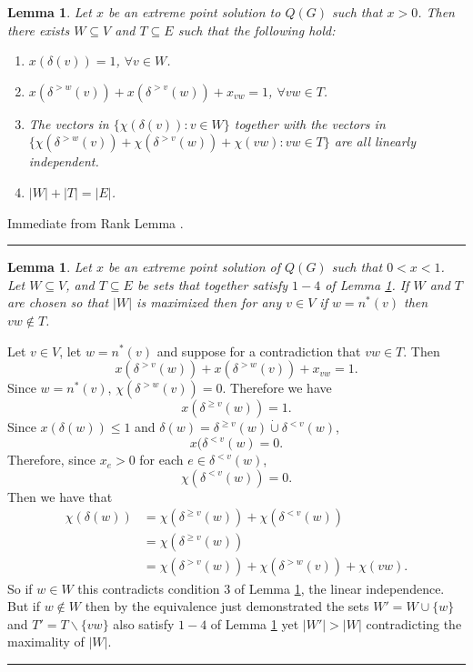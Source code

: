 \documentclass[preprint]{elsarticle}
\newtheorem{lemma}[fact]{Lemma}
\newenvironment{proof}{{\bf Proof:  }}{\hfill\rule{2mm}{2mm}}
\begin{document}
\begin{lemma}
Let $x$ be an extreme point solution to $Q(G)$ such that $x>0$. Then there exists $W \subseteq V$ and $T \subseteq E$ such that the following hold:
\label{lemma:rank}
\begin{enumerate}
\item $x(\delta(v)) = 1$, $\forall v \in W$.
\item $x(\delta^{>w}(v)) + x(\delta^{>v}(w)) + x_{vw} = 1$, $\forall vw \in T$.
\item The vectors in $\{\chi(\delta(v)) : v \in W\}$ together with the vectors in $\{\chi(\delta^{>w}(v)) + \chi(\delta^{>v}(w)) + \chi(vw) : vw \in T\}$ are all linearly independent.
\item $|W| + |T| = |E|$.
\end{enumerate}
\end{lemma}
\begin{proof}
Immediate from Rank Lemma \cite{lau2011iterative}. 
\end{proof}
\begin{lemma}
Let $x$ be an extreme point solution of $Q(G)$ such that $0 < x < 1$. Let $W \subseteq V$, and $T \subseteq E$ be sets that together satisfy $1-4$ of Lemma \ref{lemma:rank}. If $W$ and $T$ are chosen so that $|W|$ is maximized then for any $v \in V$ if $w = n^*(v)$ then $vw \not\in T$.
\label{lemma:fav}
\end{lemma}
\begin{proof}
Let $v \in V$, let $w = n^*(v)$ and suppose for a contradiction that $vw \in T$. Then 
$$x(\delta^{>v}(w)) + x(\delta^{>w}(v)) + x_{vw} = 1. $$
Since $w = n^*(v)$, $\chi(\delta^{>w}(v)) = 0$. Therefore we have
$$x(\delta^{\geq v}(w)) = 1.$$
Since $x(\delta(w)) \leq 1$ and $\delta(w) = \delta^{\geq v}(w) \dot\cup \delta^{< v}(w)$, $$x(\delta^{<v}(w) = 0. $$
Therefore, since $x_e > 0$ for each $e \in \delta^{< v}(w)$, $$\chi(\delta^{< v}(w)) = 0.$$
Then we have that
\begin{align*}
\chi(\delta(w)) &= \chi(\delta^{\geq v}(w)) + \chi(\delta^{<v}(w)) \\
&= \chi(\delta^{\geq v}(w)) \\
&= \chi(\delta^{> v}(w)) + \chi(\delta^{> w}(v)) + \chi(vw).
\end{align*}
So if $w \in W$ this contradicts condition $3$ of Lemma \ref{lemma:rank}, the linear independence. But if $w \not\in W$ then by the equivalence just demonstrated the sets $W' = W \cup \{w\}$ and $T' = T \backslash \{vw\}$ also satisfy $1-4$ of Lemma \ref{lemma:rank} yet $|W'| > |W|$ contradicting the maximality of $|W|$. 
\end{proof}
\end{document}
